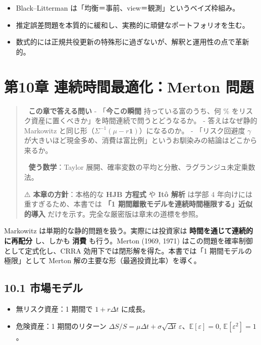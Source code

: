 \documentclass[11pt,a4paper]{report}
\begin{document}
\begin{itemize}
\item Black–Litterman は「均衡＝事前、view＝観測」というベイズ枠組み。
\item 推定誤差問題を本質的に緩和し、実務的に頑健なポートフォリオを生む。
\item 数式的には正規共役更新の特殊形に過ぎないが、解釈と運用性の点で革新的。
\end{itemize}

\noindent\hrulefill

\chapter{第10章 連続時間最適化：Merton 問題}

\begin{quote}
🎯 \textbf{この章で答える問い}
- 「\textbf{今この瞬間} 持っている富のうち、何 \% をリスク資産に置くべきか」を時間連続で問うとどうなるか。
- 答えはなぜ静的 Markowitz と同じ形（$\Sigma^{-1}(\mu - r\mathbf{1})$）になるのか。
- 「リスク回避度 $\gamma$ が大きいほど現金多め、消費は富比例」というお馴染みの結論はどこから来るか。

📐 \textbf{使う数学}：Taylor 展開、確率変数の平均と分散、ラグランジュ未定乗数法。

⚠️ \textbf{本章の方針}：本格的な \textbf{HJB 方程式} や \textbf{Itô 解析} は学部 4 年向けには重すぎるため、本書では \textbf{「1 期間離散モデルを連続時間極限する」近似的導入} だけを示す。完全な厳密版は章末の道標を参照。
\end{quote}

Markowitz は単期的な静的問題を扱う。実際には投資家は \textbf{時間を通じて連続的に再配分} し、しかも \textbf{消費} も行う。Merton (1969, 1971) はこの問題を確率制御として定式化し、CRRA 効用下では閉形解を得た。本書では「1 期間モデルの極限」として Merton 解の主要な形（最適投資比率）を導く。

\section{10.1 市場モデル}

\begin{itemize}
\item 無リスク資産：1 期間で $1 + r \Delta t$ に成長。
\item 危険資産：1 期間のリターン $\Delta S / S = \mu \Delta t + \sigma \sqrt{\Delta t}\, \varepsilon$、$\mathbb{E}[\varepsilon] = 0$, $\mathbb{E}[\varepsilon^2] = 1$。
\end{itemize}
\end{document}
